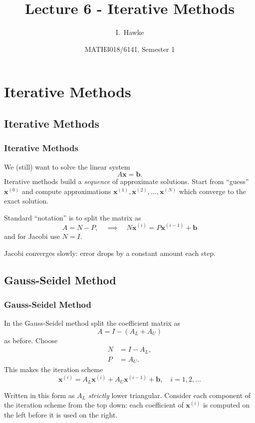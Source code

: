 \documentclass{beamer}
\title[Lecture 6] %
{Lecture 6 - Iterative Methods}
\author[I. Hawke]{I.~Hawke}
\institute[University of Southampton]%
{
  School of Mathematics, \\
  University of Southampton, UK
}
\date[Semester 1]{MATH3018/6141, Semester 1}
\newcommand{\bb}{{\boldsymbol{b}}}
\newcommand{\bx}{{\boldsymbol{x}}}
\begin{document}
\begin{frame}
  \titlepage
\end{frame}

\section{Iterative Methods}

\subsection{Iterative Methods}

\begin{frame}
  \frametitle{Iterative Methods}

   We (still) want to solve the linear system
   \begin{equation*}
     A \bx = \bb.
   \end{equation*}
   Iterative methods build a \emph{sequence} of approximate
   solutions. Start from ``guess'' $\bx^{(0)}$ and compute
   approximations $\bx^{(1)}, \bx^{(2)}, \dots, \bx^{(N)}$ which
   converge to the exact solution. \pause

   \vspace{1ex}

   Standard ``notation'' is to split the matrix as
   \begin{equation*}
     A = N - P, \quad \implies \quad N \bx^{(i)} = P \bx^{(i - 1)} + \bb
   \end{equation*}
   and for Jacobi use $N=I$. \pause

   \vspace{1ex}

   Jacobi converges slowly: error drops by a constant amount each step.

\end{frame}

\subsection{Gauss-Seidel Method}

\begin{frame}
  \frametitle{Gauss-Seidel Method}

  In the Gauss-Seidel method split the coefficient matrix as
  \begin{equation*}
    A = I - (A_L + A_U)
  \end{equation*}
  as before. Choose
  \begin{align*}
    N & = I - A_L, \\
    P & = A_U.
  \end{align*}
  This makes the iteration scheme
  \begin{equation*}
    \bx^{(i)} =  A_L \bx^{(i)} + A_U \bx^{(i - 1)} + \bb, \quad i = 1,
    2, \dots
  \end{equation*} \pause

  Written in this form as $A_L$ \emph{strictly} lower
  triangular. Consider each component of the iteration scheme from the
  top down: each coefficient of $\bx^{(i)}$ is computed on the left
  before it is used on the right.

\end{frame}
\end{document}

